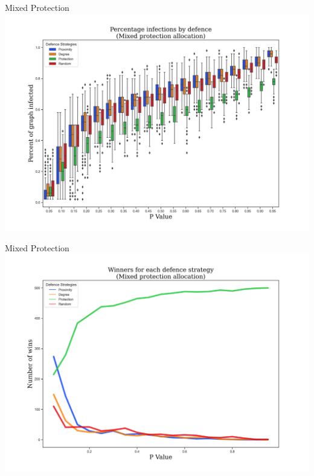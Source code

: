 \documentclass[unknownkeysallowed]{beamer}
\begin{document}
\begin{frame}{Mixed Protection}
\centering\includegraphics[height=0.8\textheight]{assets/charts/percent_infected/Mixed.jpg}
\end{frame}


\begin{frame}{Mixed Protection}
\centering\includegraphics[height=0.8\textheight]{assets/charts/winners/Mixed.jpg}
\end{frame}

\end{document}

